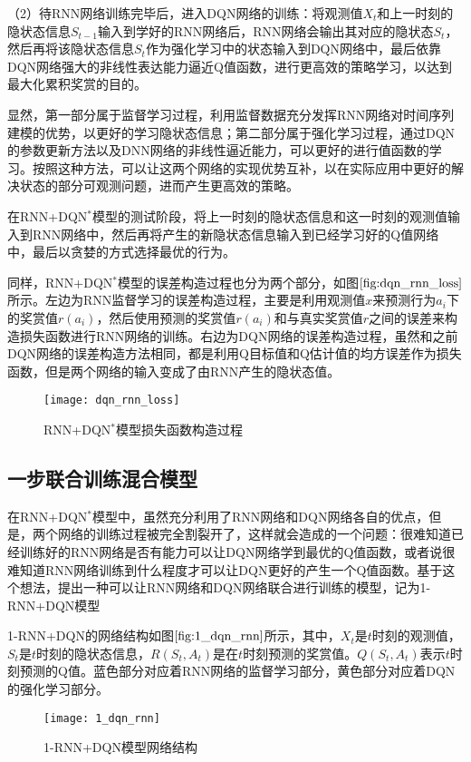 （2）待RNN网络训练完毕后，进入DQN网络的训练：将观测值$X_{t}$和上一时刻的隐状态信息$S_{t-1}$输入到学好的RNN网络后，RNN网络会输出其对应的隐状态$S_{t}$，然后再将该隐状态信息$S_{t}$作为强化学习中的状态输入到DQN网络中，最后依靠DQN网络强大的非线性表达能力逼近Q值函数，进行更高效的策略学习，以达到最大化累积奖赏的目的。

显然，第一部分属于监督学习过程，利用监督数据充分发挥RNN网络对时间序列建模的优势，以更好的学习隐状态信息；第二部分属于强化学习过程，通过DQN的参数更新方法以及DNN网络的非线性逼近能力，可以更好的进行值函数的学习。按照这种方法，可以让这两个网络的实现优势互补，以在实际应用中更好的解决状态的部分可观测问题，进而产生更高效的策略。

在RNN+DQN$^{*}$模型的测试阶段，将上一时刻的隐状态信息和这一时刻的观测值输入到RNN网络中，然后再将产生的新隐状态信息输入到已经学习好的Q值网络中，最后以贪婪的方式选择最优的行为。

同样，RNN+DQN$^{*}$模型的误差构造过程也分为两个部分，如图$\ref{fig:dqn_rnn_loss}$所示。左边为RNN监督学习的误差构造过程，主要是利用观测值$x$来预测行为$a_{i}$下的奖赏值$r(a_{i})$，然后使用预测的奖赏值$r(a_{i})$和与真实奖赏值$r$之间的误差来构造损失函数进行RNN网络的训练。右边为DQN网络的误差构造过程，虽然和之前DQN网络的误差构造方法相同，都是利用Q目标值和Q估计值的均方误差作为损失函数，但是两个网络的输入变成了由RNN产生的隐状态值。
\begin{figure}[htbp]
\centering
\texttt{[image: dqn\_rnn\_loss]}
\caption{RNN+DQN$^{*}$模型损失函数构造过程}
\label{fig:dqn_rnn_loss}
\end{figure}

\subsection{一步联合训练混合模型}
在RNN+DQN$^{*}$模型中，虽然充分利用了RNN网络和DQN网络各自的优点，但是，两个网络的训练过程被完全割裂开了，这样就会造成的一个问题：很难知道已经训练好的RNN网络是否有能力可以让DQN网络学到最优的Q值函数，或者说很难知道RNN网络训练到什么程度才可以让DQN更好的产生一个Q值函数。基于这个想法，提出一种可以让RNN网络和DQN网络联合进行训练的模型，记为1-RNN+DQN模型

1-RNN+DQN的网络结构如图$\ref{fig:1_dqn_rnn}$所示，其中，$X_{t}$是$t$时刻的观测值，$S_{t}$是$t$时刻的隐状态信息，$R(S_{t},A_{t})$是在$t$时刻预测的奖赏值。$Q(S_{t},A_{t})$表示$t$时刻预测的Q值。蓝色部分对应着RNN网络的监督学习部分，黄色部分对应着DQN的强化学习部分。
\begin{figure}[htbp]
\centering
\texttt{[image: 1\_dqn\_rnn]}
\caption{1-RNN+DQN模型网络结构}
\label{fig:1_dqn_rnn}
\end{figure}

